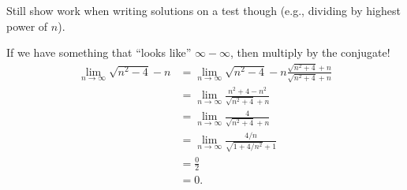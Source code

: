 \begin{Remark}{}{}
    Still show work when writing solutions on a test though (e.g.,
    dividing by highest power of $ n $).
\end{Remark}
\begin{Example}{}{}
    If we have something that ``looks like'' $ \infty-\infty $,
    then multiply by the conjugate!
    \begin{align*}
        \lim\limits_{{n} \to {\infty}}\sqrt{n^2-4}-n
         & =\lim\limits_{{n} \to {\infty}}\sqrt{n^2-4}-n \frac{\sqrt{n^2+4}+n}{\sqrt{n^2+4}+n} \\
         & =\lim\limits_{{n} \to {\infty}}\frac{n^2+4-n^2}{\sqrt{n^2+4}+n}                     \\
         & =\lim\limits_{{n} \to {\infty}}\frac{4}{\sqrt{n^2+4}+n}                             \\
         & =\lim\limits_{{n} \to {\infty}}\frac{4/n}{\sqrt{1+4/n^2}+1}                         \\
         & =\frac{0}{2}                                                                        \\
         & =0.
    \end{align*}
\end{Example}
